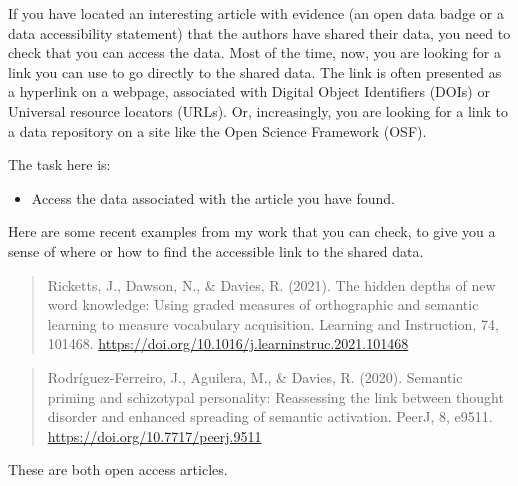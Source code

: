 \documentclass[
  letterpaper,
  DIV=11,
  numbers=noendperiod]{scrreprt}
\providecommand{\tightlist}{%
  \setlength{\itemsep}{0pt}\setlength{\parskip}{0pt}}\usepackage{longtable,booktabs,array}
\begin{document}
If you have located an interesting article with evidence (an open data
badge or a data accessibility statement) that the authors have shared
their data, you need to check that you can access the data. Most of the
time, now, you are looking for a link you can use to go directly to the
shared data. The link is often presented as a hyperlink on a webpage,
associated with Digital Object Identifiers (DOIs) or Universal resource
locators (URLs). Or, increasingly, you are looking for a link to a data
repository on a site like the Open Science Framework (OSF).

\begin{tcolorbox}[enhanced jigsaw, opacitybacktitle=0.6, title=\textcolor{quarto-callout-tip-color}{\faLightbulb}\hspace{0.5em}{Tip}, arc=.35mm, colbacktitle=quarto-callout-tip-color!10!white, colframe=quarto-callout-tip-color-frame, leftrule=.75mm, opacityback=0, breakable, titlerule=0mm, left=2mm, bottomrule=.15mm, toprule=.15mm, colback=white, coltitle=black, bottomtitle=1mm, toptitle=1mm, rightrule=.15mm]

The task here is:

\begin{itemize}
\tightlist
\item
  Access the data associated with the article you have found.
\end{itemize}

\end{tcolorbox}

Here are some recent examples from my work that you can check, to give
you a sense of where or how to find the accessible link to the shared
data.

\begin{quote}
Ricketts, J., Dawson, N., \& Davies, R. (2021). The hidden depths of new
word knowledge: Using graded measures of orthographic and semantic
learning to measure vocabulary acquisition. Learning and Instruction,
74, 101468. \url{https://doi.org/10.1016/j.learninstruc.2021.101468}
\end{quote}

\begin{quote}
Rodríguez-Ferreiro, J., Aguilera, M., \& Davies, R. (2020). Semantic
priming and schizotypal personality: Reassessing the link between
thought disorder and enhanced spreading of semantic activation. PeerJ,
8, e9511. \url{https://doi.org/10.7717/peerj.9511}
\end{quote}

These are both open access articles.
\end{document}
